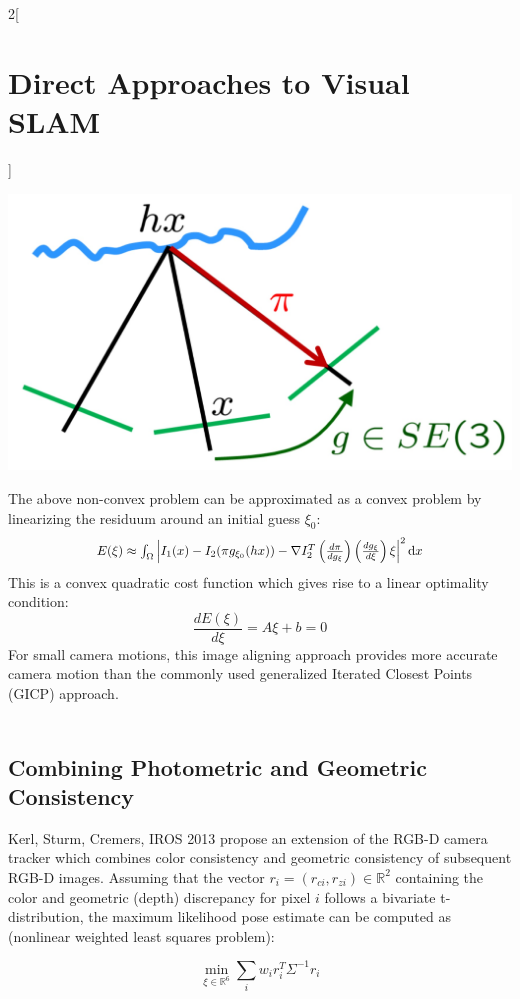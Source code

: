 \documentclass[oneside,fontsize=11pt,paper=a4]{scrartcl}
\newcommand*{\Scale}[2][4]{\scalebox{#1}{$#2$}}%
\newenvironment{myfigure}
  {\par\medskip\noindent\minipage{\linewidth}}
  {\endminipage\par\medskip}
\begin{document}
\begin{multicols}{2}[\section{Direct Approaches to Visual SLAM}]
\begin{myfigure}
 \centering
 \includegraphics[width=0.9\linewidth]{Images/Dense_RGB-D_Tracking.jpg}
\end{myfigure}
The above non-convex problem can be approximated as a convex problem by linearizing the residuum around an initial guess $\xi_0$:
\begin{equation*}
    \Scale[0.92]{E(\xi) \approx \int_{\Omega} \left| I_1(x) - I_2(\pi g_{\xi_0} (hx)) - \nabla I_2^T \left(\frac{d\pi}{dg_{\xi}} \right) \left(\frac{dg_{\xi}}{d \xi} \right) \xi \right|^2 \mathrm{d}x}
\end{equation*}
This is a convex quadratic cost function which gives rise to a linear optimality condition:
\begin{equation*}
    \frac{d E(\xi)}{d \xi} = A \xi + b = 0
\end{equation*}
For small camera motions, this image aligning approach provides more accurate camera motion than the commonly used generalized Iterated Closest Points (GICP) approach.\\ \\

\subsection{Combining Photometric and Geometric Consistency}
Kerl, Sturm, Cremers, IROS 2013 propose an extension of the RGB-D camera tracker which combines color consistency and geometric consistency of subsequent RGB-D images.
Assuming that the vector $r_i = (r_{ci}, r_{zi}) \in \mathbb{R}^2$ containing the color and geometric (depth) discrepancy for pixel $i$ follows a bivariate t-distribution, the maximum likelihood pose estimate can be computed as (nonlinear weighted least squares problem):

\begin{equation*}
    \min_{\xi \in \mathbb{R}^6} \sum_i w_i r_i^T \Sigma^{-1} r_i
\end{equation*}


\end{multicols}
\end{document}
